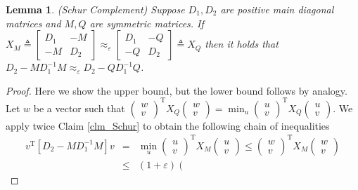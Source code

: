 \documentclass[11pt]{article}
\newcommand{\rot}{\mathrm{T}}
\newcommand{\eps}{\epsilon}
\renewcommand{\leq}{\leqslant}
\renewcommand{\eps}{\varepsilon}
\newtheorem{lem}[thm]{Lemma}
\numberwithin{thm}{section}
\begin{document}
\begin{lem}
\label{lem_Schur}(Schur Complement) Suppose $D_{1},D_{2}$ are positive main diagonal matrices
and $M,Q$ are symmetric matrices. If $X_{M}\triangleq\left[\begin{array}{cc}
D_{1} & -M\\
-M & D_{2}
\end{array}\right]\approx_{\eps}\left[\begin{array}{cc}
D_{1} & -Q\\
-Q & D_{2}
\end{array}\right]\triangleq X_{Q}$ then it holds that $D_{2}-MD_{1}^{-1}M\approx_{\eps}D_{2}-QD_{1}^{-1}Q$.
\end{lem}

\begin{proof}
Here we show the upper bound, but
the lower bound follows by analogy. Let $w$ be a vector such that
$\left(\begin{array}{c}
w\\
v
\end{array}\right)^{\rot}X_{Q}\left(\begin{array}{c}
w\\
v
\end{array}\right)=\min_{u}\left(\begin{array}{c}
u\\
v
\end{array}\right)^{\rot}X_{Q}\left(\begin{array}{c}
u\\
v
\end{array}\right)$. We apply twice Claim \ref{clm_Schur}
to obtain the following chain of inequalities
\begin{eqnarray*}
v^{\rot}[D_{2}-MD_{1}^{-1}M]v&=&\min_{u}\left(\begin{array}{c}
u\\
v
\end{array}\right)^{\rot}X_{M}\left(\begin{array}{c}
u\\
v
\end{array}\right)\leq\left(\begin{array}{c}
w\\
v
\end{array}\right)^{\rot}X_{M}\left(\begin{array}{c}
w\\
v
\end{array}\right)\\&\leq&(1+\eps)\left(\begin{array}{c}

\end{array}
\end{eqnarray*}
\end{proof}
\end{document}
